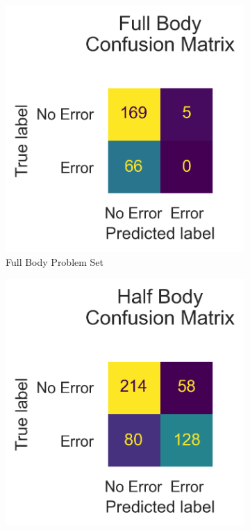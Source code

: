 \begin{figure}[htbp]
  \centering
  \begin{subfigure}[b]{0.4\linewidth}
      \centering
      \includegraphics[width=\textwidth]{figures/Results/v2/confusion/full_together.png}
      \caption[]{Full Body Problem Set}
      \label{fig:fb_conf}
  \end{subfigure}
  \hfill
  \begin{subfigure}[b]{0.4\linewidth}
      \centering
      \includegraphics[width=\textwidth]{figures/Results/v2/confusion/half_together.png}

\end{subfigure}
\end{figure}
